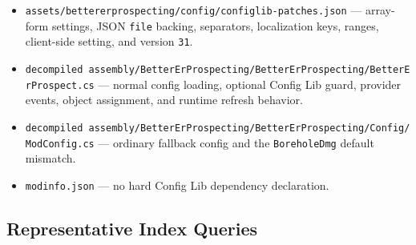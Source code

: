 \documentclass[
  11pt,
  letterpaper,
  titlepage]{article}
\providecommand{\tightlist}{%
  \setlength{\itemsep}{0pt}\setlength{\parskip}{0pt}}
\begin{document}
\begin{itemize}
\tightlist
\item
  \texttt{assets/bettererprospecting/config/configlib-patches.json} ---
  array-form settings, JSON \texttt{file} backing, separators,
  localization keys, ranges, client-side setting, and version
  \texttt{31}.
\item
  \texttt{decompiled\ assembly/BetterErProspecting/BetterErProspecting/BetterErProspect.cs}
  --- normal config loading, optional Config Lib guard, provider events,
  object assignment, and runtime refresh behavior.
\item
  \texttt{decompiled\ assembly/BetterErProspecting/BetterErProspecting/Config/ModConfig.cs}
  --- ordinary fallback config and the \texttt{BoreholeDmg} default
  mismatch.
\item
  \texttt{modinfo.json} --- no hard Config Lib dependency declaration.
\end{itemize}

\subsection{Representative Index
Queries}\label{representative-index-queries}
\end{document}
